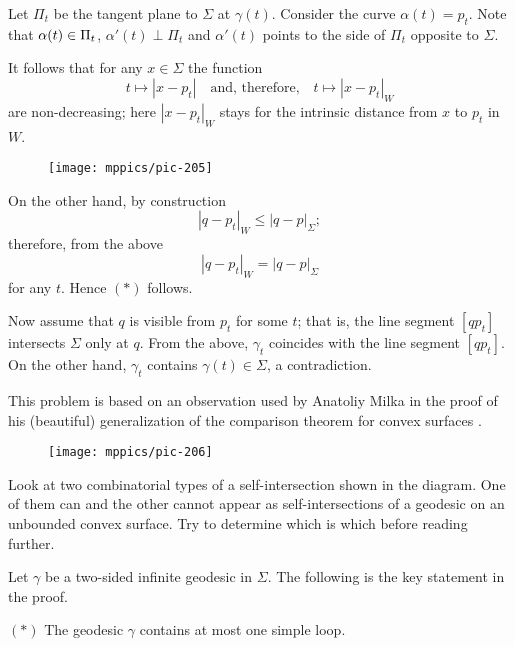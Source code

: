 \medskip

Let $\Pi_t$ be the tangent plane to $\Sigma$ at $\gamma(t)$.
Consider the curve $\alpha(t)=p_t$.
Note that  
$\alpha(t)\z\in\Pi_t$,
$\alpha'(t)\perp\Pi_t$
and $\alpha'(t)$ points to the side of $\Pi_t$ opposite to $\Sigma$.



It follows that for any $x\in\Sigma$ the function  
\[t\mapsto |x - p_t|
\quad\text{and, therefore,}\quad
t\mapsto |x - p_t|_W\] are non-decreasing;
here $|x - p_t|_W$ stays for the intrinsic distance from $x$ to $p_t$ in $W$.


\begin{wrapfigure}{r}{43 mm}
\vskip-6mm
\centering
\texttt{[image: mppics/pic-205]}
\end{wrapfigure}

On the other hand, by construction 
\[|q - p_t|_W\le |q - p|_\Sigma;\] 
therefore, from the above 
\[|q - p_t|_W= |q - p|_\Sigma\]
for any $t$.
Hence $(*)$ follows.

Now assume that $q$ is visible from $p_t$ for some $t$;
that is, the line segment $[qp_t]$ intersects $\Sigma$ only at $q$.
From the above, 
$\gamma_t$  coincides with the line segment $[qp_t]$.
On the other hand, $\gamma_t$ contains $\gamma(t)\in\Sigma$, a contradiction.\qeds

This problem is based on an observation used by Anatoliy Milka in the proof of his (beautiful) generalization of the comparison theorem for convex surfaces \cite{milka-geod}.


\begin{wrapfigure}{r}{43 mm}
\vskip-0mm
\centering
\texttt{[image: mppics/pic-206]}
\end{wrapfigure}

Look at two combinatorial types of a self-intersection shown in the diagram.
One of them can and the other cannot appear as self-intersections of a geodesic on an unbounded convex surface.
Try to determine which is which before reading further.

\medskip

Let $\gamma$ be a two-sided infinite geodesic in $\Sigma$.
The following is the key statement in the proof.

\begin{cl}{$({*})$}
The geodesic $\gamma$ contains at most one simple loop.
\end{cl}

